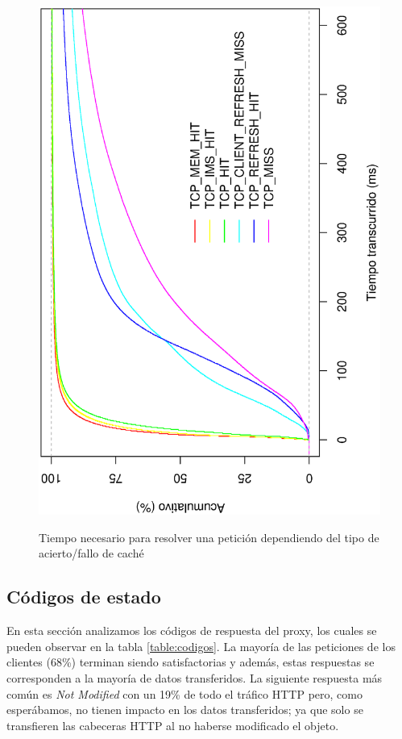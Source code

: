 \documentclass[twocolumn]{Jornadas}
\begin{document}
\begin{figure}[ht!]
\includegraphics[scale=0.30,angle=-90]{figures/ElapsedTimeAll_1k_full.eps} \label{fig:elapsed}
\caption{Tiempo necesario para resolver una petición dependiendo del tipo de acierto/fallo de caché}
\label{fig:elapsed}
\end{figure}

\subsection{Códigos de estado}
En esta sección analizamos los códigos de respuesta del proxy, los cuales se pueden observar en la tabla \ref{table:codigos}. La mayoría de las peticiones de los clientes (68\%) terminan siendo satisfactorias y además, estas respuestas se corresponden a la mayoría de datos transferidos. La siguiente respuesta más común es \textit{Not Modified} con un 19\% de todo el tráfico HTTP pero, como esperábamos, no tienen impacto en los datos transferidos; ya que solo se transfieren las cabeceras HTTP al no haberse modificado el objeto.
\end{document}
